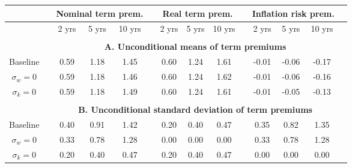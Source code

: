 \begin{tabular}{cccccccccccccc} \hline &&\multicolumn{3}{c}{Nominal term prem.}&&\multicolumn{3}{c}{Real term prem.}&&\multicolumn{3}{c}{Inflation risk prem.}\\ \hline &&2 yrs& 5 yrs& 10 yrs&&2 yrs& 5 yrs& 10 yrs&&2 yrs& 5 yrs& 10 yrs\\ \hline \\ && \multicolumn{11}{c}{\bf{A. Unconditional means of term premiums}}\\ \hline Baseline & & 0.59 & 1.18 & 1.45 &  & 0.60 & 1.24 & 1.61 &  & -0.01 & -0.06 & -0.17 \\ $\sigma_w=0$ & & 0.59 & 1.18 & 1.46 &  & 0.60 & 1.24 & 1.62 &  & -0.01 & -0.06 & -0.16 \\ $\sigma_k=0$ & & 0.59 & 1.18 & 1.49 &  & 0.60 & 1.24 & 1.61 &  & -0.01 & -0.05 & -0.13 \\  \hline \\ && \multicolumn{11}{c}{\bf{B. Unconditional standard deviation of term premiums}}\\ \hline Baseline & & 0.40 & 0.91 & 1.42 &  & 0.20 & 0.40 & 0.47 &  & 0.35 & 0.82 & 1.35 \\ $\sigma_w=0$ & & 0.33 & 0.78 & 1.28 &  & 0.00 & 0.00 & 0.00 &  & 0.33 & 0.78 & 1.28 \\ $\sigma_k=0$ & & 0.20 & 0.40 & 0.47 &  & 0.20 & 0.40 & 0.47 &  & 0.00 & 0.00 & 0.00 \\ \hline \end{tabular}